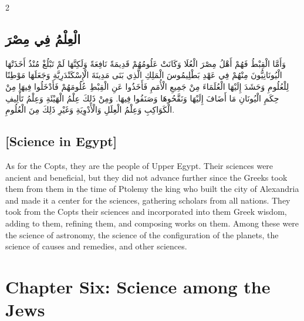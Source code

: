 \documentclass[11pt,a4paper]{article}
\newcommand{\ar}[1]{\arabicfont\beginR #1\endR}
\begin{document}
\begin{paracol}{2}
\sloppy

\begin{leftcolumn}
\subsection*{\ar{الْعِلْمُ فِي مِصْرَ}}
\vspace{0.3cm}
{\arabicfont\beginR
وَأَمَّا الْقِبْطُ فَهُمْ أَهْلُ مِصْرَ الْعُلَا وَكَانَتْ عَلُومُهُمْ قَدِيمَةً نَافِعَةً وَلَكِنَّهَا لَمْ تَبْلُغْ مُنْذُ أَخَذَتْهَا الْيُونَانِيُّونَ مِنْهُمْ فِي عَهْدِ بَطْلِيمُوسَ الْمَلِكِ الَّذِي بَنَى مَدِينَةَ الْإِسْكَنْدَرِيَّةِ وَجَعَلَهَا مَوْطِنًا لِلْعُلُومِ وَحَشَدَ إِلَيْهَا الْعُلَمَاءَ مِنْ جَمِيعِ الْأُمَمِ فَأَخَذُوا عَنِ الْقِبْطِ عُلُومَهُمْ فَأَدْخَلُوا فِيهَا مِنْ حِكَمِ الْيُونَانِ مَا أَضَافَ إِلَيْهَا وَنَقَّحُوهَا وَصَنَفُوا فِيهَا. وَمِنْ ذَلِكَ عِلْمُ الْهَيْئَةِ وَعِلْمُ تَأْلِيفِ الْكَوَاكِبِ وَعِلْمُ الْعِلَلِ وَالْأَدْوِيَةِ وَغَيْرِ ذَلِكَ مِنَ الْعُلُومِ.
\endR}
\end{leftcolumn}

\begin{rightcolumn}
\subsection*{[Science in Egypt]}
\vspace{0.3cm}
As for the Copts, they are the people of Upper Egypt. Their sciences were ancient and beneficial, but they did not advance further since the Greeks took them from them in the time of Ptolemy the king who built the city of Alexandria and made it a center for the sciences, gathering scholars from all nations. They took from the Copts their sciences and incorporated into them Greek wisdom, adding to them, refining them, and composing works on them. Among these were the science of astronomy, the science of the configuration of the planets, the science of causes and remedies, and other sciences.
\end{rightcolumn}

\end{paracol}

\clearpage

\section*{Chapter Six: Science among the Jews}
\end{document}
